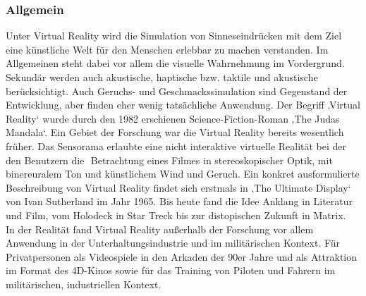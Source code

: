 \documentclass[12pt,a4paper,bibliography=totocnumbered,listof=totocnumbered]{scrartcl}
\begin{document}
\subsubsection{Allgemein}
Unter Virtual Reality wird die Simulation von Sinneseindrücken mit dem Ziel eine künstliche Welt für den Menschen erlebbar zu machen verstanden. Im Allgemeinen steht dabei vor allem die visuelle Wahrnehmung im Vordergrund. Sekundär werden auch akustische, haptische bzw. taktile und akustische berücksichtigt. Auch Geruchs- und Geschmackssimulation sind Gegenstand der Entwicklung, aber finden eher wenig tatsächliche Anwendung.
Der Begriff ‚Virtual Reality‘ wurde durch den 1982 erschienen Science-Fiction-Roman ‚The Judas Mandala‘. Ein Gebiet der Forschung war die Virtual Reality bereits wesentlich früher.
Das Sensorama erlaubte eine nicht interaktive virtuelle Realität bei der den Benutzern die  Betrachtung eines Filmes in stereoskopischer Optik, mit binereuralem Ton und künstlichem Wind und Geruch. Ein konkret ausformulierte Beschreibung von Virtual Reality findet sich erstmals in ‚The Ultimate Display‘ von Ivan Sutherland im Jahr 1965. Bis heute fand die Idee Anklang in Literatur und Film, vom Holodeck in Star Treck bis zur distopischen Zukunft in Matrix.  In der Realität fand Virtual Reality außerhalb der Forschung vor allem Anwendung in der Unterhaltungsindustrie und im militärischen Kontext. Für Privatpersonen als Videospiele in den Arkaden der 90er Jahre und als Attraktion im Format des 4D-Kinos sowie für das Training von Piloten und Fahrern im militärischen, industriellen Kontext.
\end{document}
